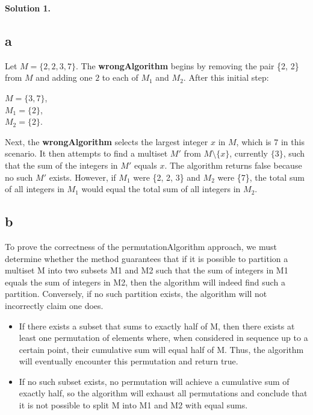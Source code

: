 \documentclass[12pt]{article}
\newcommand{\solution}[1]{\noindent \textbf{Solution #1.}}
\begin{document}
\solution{1} 
    \subsection*{a} Let \(M = \{2, 2, 3, 7\}\). The \textbf{wrongAlgorithm} begins by removing the pair \{2, 2\} from \(M\) and adding one \(2\) to each of \(M_1\) and \(M_2\). After this initial step:
    \begin{center}
        \(M = \{3, 7\}\),\\
        \(M_1 = \{2\}\),\\
        \(M_2 = \{2\}\).
    \end{center}
    Next, the \textbf{wrongAlgorithm} selects the largest integer \(x\) in \(M\), which is \(7\) in this scenario. It then attempts to find a multiset \(M'\) from \(M \setminus \{x\}\), currently \(\{3\}\), such that the sum of the integers in \(M'\) equals \(x\). The algorithm returns false because no such \(M'\) exists. However, if \(M_1\) were \{2, 2, 3\} and \(M_2\) were \{7\}, the total sum of all integers in \(M_1\) would equal the total sum of all integers in \(M_2\).


    \subsection*{b} 

    To prove the correctness of the permutationAlgorithm approach, we must determine whether the method guarantees that if it is possible to partition a multiset M into two subsets M1 and M2 such that the sum of integers in M1 equals the sum of integers in M2, then the algorithm will indeed find such a partition. Conversely, if no such partition exists, the algorithm will not incorrectly claim one does.

    \begin{itemize}
        \item If there exists a subset that sums to exactly half of M, then there exists at least one permutation of elements where, when considered in sequence up to a certain point, their cumulative sum will equal half of M. Thus, the algorithm will eventually encounter this permutation and return true.
        \item If no such subset exists, no permutation will achieve a cumulative sum of exactly half, so the algorithm will exhaust all permutations and conclude that it is not possible to split M into M1 and M2 with equal sums.
    \end{itemize}
\end{document}
